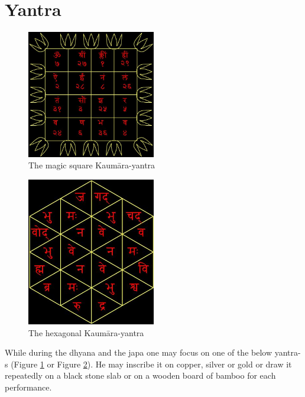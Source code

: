 \documentclass[12pt]{article}
\begin{document}
\section{Yantra}
\begin{figure}[h]
  \centering
    \includegraphics[width=0.5\textwidth]{kaumara_magic_square}
    \caption{The magic square Kaumāra-yantra}
    \label{fig:fig1}
    \end{figure}

\begin{figure}[h]
  \centering
    \includegraphics[width=0.5\textwidth]{shaktyuta_mUrti_yantra}
    \caption{The hexagonal Kaumāra-yantra}
    \label{fig:fig2}
    \end{figure}
While during the dhyana and the japa one may focus on one of the below yantra-s (Figure \ref{fig:fig1} or Figure \ref{fig:fig2}). He may inscribe it on copper, silver or gold or draw it repeatedly on a black stone slab or on a wooden board of bamboo for each performance.
\end{document}
